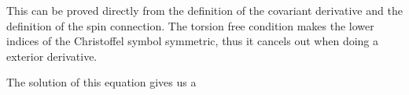 This can be proved directly from the definition of the covariant derivative and the definition of the spin connection. The torsion free condition makes the lower indices of the Christoffel symbol symmetric, thus it cancels out when doing a exterior derivative.

The solution of this equation gives us a


